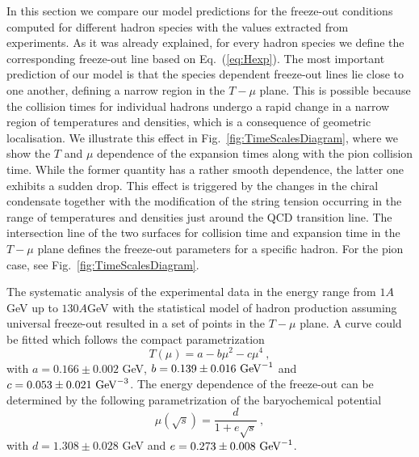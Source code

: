 \documentclass[12pt]{article}
\begin{document}
In this section we compare our model predictions for the freeze-out conditions computed for different hadron species with the values extracted from experiments.
As it was already explained, for every hadron species we define the corresponding freeze-out line based on Eq.~(\ref{eq:Hexp}). 
The most important prediction of our model is that the species dependent freeze-out lines lie close to one another, defining a narrow region in the $T-\mu$ plane. 
This is possible because the collision times for individual hadrons undergo a rapid change in a narrow region of temperatures and densities, which is a consequence of geometric localisation.
We illustrate this effect in Fig.~\ref{fig:TimeScalesDiagram}, where we show the $T$ and $\mu$ 
dependence of the expansion times along with the pion collision time.
While the former quantity has a rather smooth dependence, the latter one exhibits a sudden drop. 
This effect is triggered by the changes in the chiral condensate together with the modification of the string tension occurring in the range of temperatures and densities just around the QCD transition line. 
The intersection line of the two surfaces for collision time and expansion time in the $T-\mu$ plane defines the freeze-out parameters for a specific hadron. For the pion case, see Fig.~\ref{fig:TimeScalesDiagram}. 

The systematic analysis of the experimental data in the energy range from $1 A$GeV up to $130 A$GeV 
with the statistical model of hadron production assuming universal freeze-out resulted in a set of points in the $T-\mu$ plane. A curve could be fitted which follows the compact parametrization 
\cite{Cleymans:2005xv}
%
\begin{equation}
T(\mu) = a - b\mu^2-c\mu^4~,
\label{eq:TmuParametrization}
\end{equation}
%
with $a=0.166\pm0.002$ GeV, $b=0.139\pm0.016~{\rm GeV}^{-1}$
and $c=0.053\pm0.021~{\rm GeV}^{-3}$.
The energy dependence of the freeze-out can be determined by the following parametrization of the
baryochemical potential
%
\begin{equation}
\mu(\sqrt{s}) = \frac{d}{1+e\sqrt{s}}~,
\label{eq:sdependence}
\end{equation}
%
with $d=1.308\pm0.028$ GeV and $e=0.273\pm0.008~{\rm GeV}^{-1}$. 

\end{document}

